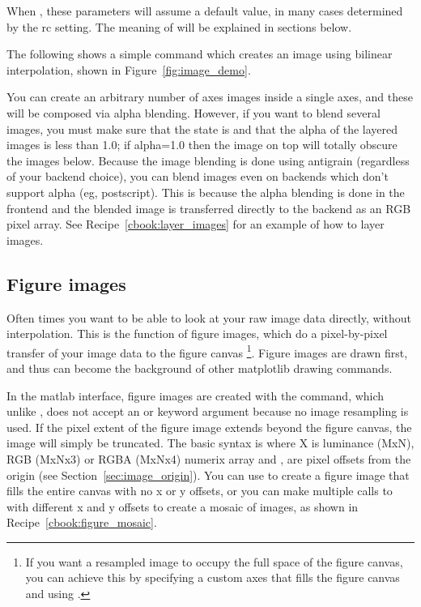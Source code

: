 \documentclass[]{book}
\begin{document}
When , these parameters will assume a default value, in
many cases determined by the rc setting.  The meaning of  will be explained in sections below.

The following shows a simple command which creates an image using
bilinear interpolation, shown in Figure~\ref{fig:image_demo}.




You can create an arbitrary number of axes images inside a single
axes, and these will be composed via alpha blending.  However, if you
want to blend several images, you must make sure that the
 state is  and that the alpha of the
layered images is less than 1.0; if alpha=1.0 then the image on top
will totally obscure the images below.  Because the image blending is
done using antigrain (regardless of your backend choice), you can
blend images even on backends which don't support alpha (eg,
postscript).  This is because the alpha blending is done in the
frontend and the blended image is transferred directly to the backend
as an RGB pixel array.  See Recipe~\ref{cbook:layer_images} for an example of
how to layer images.


\subsection{Figure images}
\label{sec:image_figure}
Often times you want to be able to look at your raw image data
directly, without interpolation.  This is the function of figure
images, which do a pixel-by-pixel transfer of your image data to the
figure canvas \footnote{If you want a resampled image to occupy the
  full space of the figure canvas, you can achieve this by specifying
  a custom axes that fills the figure canvas  and using .}.  Figure images are drawn first,
and thus can become the background of other matplotlib drawing
commands.

In the matlab interface, figure images are created with the
 command, which unlike , does not
accept an  or  keyword argument
because no image resampling is used.  If the pixel extent of the
figure image extends beyond the figure canvas, the image will simply
be truncated.  The basic syntax is 
where X is luminance (MxN), RGB (MxNx3) or RGBA (MxNx4) numerix array
and ,  are pixel offsets from the origin (see
Section~\ref{sec:image_origin}).  You can use  to create a
figure image that fills the entire canvas with no x or y offsets, or
you can make multiple calls to  with different x and
y offsets to create a mosaic of images, as shown in
Recipe~\ref{cbook:figure_mosaic}.
\end{document}
